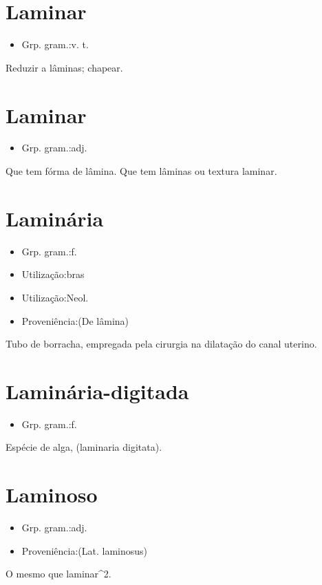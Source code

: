 \section{Laminar}
\begin{itemize}
\item {Grp. gram.:v. t.}
\end{itemize}
Reduzir a lâminas; chapear.
\section{Laminar}
\begin{itemize}
\item {Grp. gram.:adj.}
\end{itemize}
Que tem fórma de lâmina.
Que tem lâminas ou textura laminar.
\section{Laminária}
\begin{itemize}
\item {Grp. gram.:f.}
\end{itemize}
\begin{itemize}
\item {Utilização:bras}
\end{itemize}
\begin{itemize}
\item {Utilização:Neol.}
\end{itemize}
\begin{itemize}
\item {Proveniência:(De \textunderscore lâmina\textunderscore )}
\end{itemize}
Tubo de borracha, empregada pela cirurgia na dilatação do canal uterino.
\section{Laminária-digitada}
\begin{itemize}
\item {Grp. gram.:f.}
\end{itemize}
Espécie de alga, (\textunderscore laminaria digitata\textunderscore ).
\section{Laminoso}
\begin{itemize}
\item {Grp. gram.:adj.}
\end{itemize}
\begin{itemize}
\item {Proveniência:(Lat. \textunderscore laminosus\textunderscore )}
\end{itemize}
O mesmo que \textunderscore laminar\textunderscore ^2.
